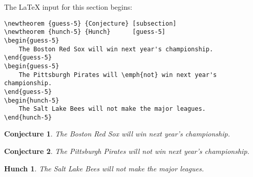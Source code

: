 The \LaTeX{} input for this section begins:
%
\begin{verbatim}
\newtheorem {guess-5} {Conjecture} [subsection]
\newtheorem {hunch-5} {Hunch}      [guess-5]
\begin{guess-5}
    The Boston Red Sox will win next year's championship.
\end{guess-5}
\begin{guess-5}
    The Pittsburgh Pirates will \emph{not} win next year's championship.
\end{guess-5}
\begin{hunch-5}
    The Salt Lake Bees will not make the major leagues.
\end{hunch-5}
\end{verbatim}

%
\newtheorem {guess-5} {Conjecture} [subsection]
\newtheorem {hunch-5} {Hunch}      [guess-5]

\begin{guess-5}
    The Boston Red Sox will win next year's championship.
\end{guess-5}

\begin{guess-5}
    The Pittsburgh Pirates will \emph{not} win next year's championship.
\end{guess-5}

\begin{hunch-5}
    The Salt Lake Bees will not make the major leagues.
\end{hunch-5}
